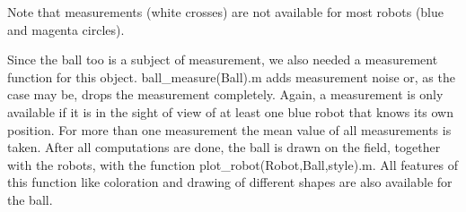 Note that measurements (white crosses) are not available for most robots (blue and magenta circles).



Since the ball too is a subject of measurement, we also needed a measurement function for this object. {\selectfont ball\_measure(Ball).m} adds measurement noise or, as the case may be, drops the measurement completely. Again, a measurement is only available if it is in the sight of view of at least one blue robot that knows its own position. For more than one measurement the mean value of all measurements is taken. After all computations are done, the ball is drawn on the field, together with the robots, with the function {\selectfont plot\_robot(Robot,Ball,style).m}. All features of this function like coloration and drawing of different shapes are also available for the ball.

